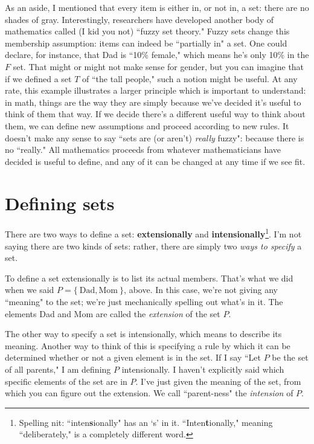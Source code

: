 As an aside, I mentioned that every item is either in, or not in, a set:
there are no shades of gray. Interestingly, researchers have developed
another body of mathematics called (I kid you not) ``fuzzy set theory."
 Fuzzy sets change this membership assumption: items can
indeed be ``partially in" a set. One could declare, for instance, that
Dad is ``10\% female," which means he's only 10\% in the $F$ set. That
might or might not make sense for gender, but you can imagine that if we
defined a set $T$ of ``the tall people," such a notion might be useful. At
any rate, this example illustrates a larger principle which is important to
understand: in math, things are the way they are simply because we've
decided it's useful to think of them that way. If we decide there's a
different useful way to think about them, we can define new assumptions and
proceed according to new rules. It doesn't make any sense to say ``sets are
(or aren't) \textit{really} fuzzy": because there is no ``really." All
mathematics proceeds from whatever mathematicians have decided is useful to
define, and any of it can be changed at any time if we see fit.

\section{Defining sets}

There are two ways to define a set: \textbf{extensionally} and
\textbf{intensionally}\footnote{Spelling nit: ``inten\textbf{s}ionally" has
an `s' in it. ``Inten\textbf{t}ionally," meaning ``deliberately," is a
completely different word.}. I'm not saying there are two kinds of sets:
rather, there are simply two \textit{ways to specify} a set.

To define a set extensionally is to list its actual members. That's what we
did when we said $P = \{~\text{Dad}, \text{Mom}~\}$, above. In this
case, we're not giving any ``meaning" to the set; we're just mechanically
spelling out what's in it. The elements Dad and Mom are called the
\textit{extension}  of the set $P$.

The other way to specify a set is intensionally, which means to describe
its meaning. Another way to think of this is specifying a rule by which it
can be determined whether or not a given element is in the set. If I say
``Let $P$ be the set of all parents," I am defining $P$ intensionally. I
haven't explicitly said which specific elements of the set are in $P$. I've
just given the meaning of the set, from which you can figure out the
extension. We call ``parent-ness" the \textit{intension} 
of $P$.

